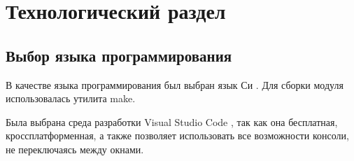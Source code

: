 \section{Технологический раздел}

\subsection{Выбор языка программирования}
В качестве языка программирования был выбран язык Си \cite{c}. Для сборки модуля использовалась утилита make.

Была выбрана среда разработки Visual Studio Code \cite{VStudio}, так как она бесплатная, кроссплатформенная,  а также позволяет использовать все возможности консоли, не переключаясь между окнами. \newline

